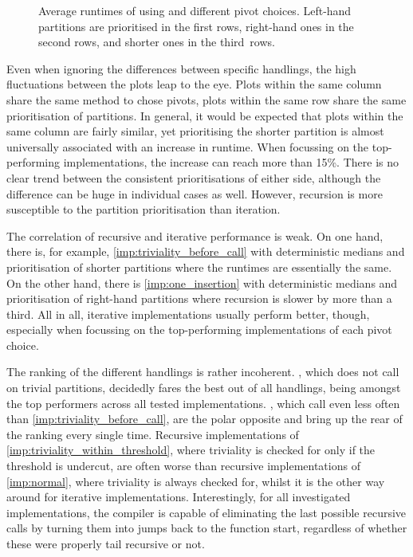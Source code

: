 \begin{figure}[p]
	\tikzexternaldisable
	\hfil{}\hfil
	\tikzexternalenable
	\caption{
		Average runtimes of \QS*{} using  and different pivot choices.
		Left-hand partitions are prio\-ri\-tised in the first rows, right-hand ones in the second rows, and shorter ones in the third~rows.
	}
	\label{fig:quick:implementations}
\end{figure}

Even when ignoring the differences between specific handlings, the high fluctuations between the plots leap to the eye.
Plots within the same column share the same method to chose pivots, plots within the same row share the same prioritisation of partitions.
In general, it would be expected that plots within the same column are fairly similar, yet prioritising the shorter partition is almost universally associated with an increase in runtime.
When focussing on the top-performing implementations, the increase can reach more than 15\%.
There is no clear trend between the consistent prioritisations of either side, although the difference can be huge in individual cases as well.
However, recursion is more susceptible to the partition prioritisation than iteration.

The correlation of recursive and iterative performance is weak.
On one hand, there is, for example, \cref{imp:triviality_before_call} with deterministic medians and prioritisation of shorter partitions where the runtimes are essentially the same.
On the other hand, there is \cref{imp:one_insertion} with deterministic medians and prioritisation of right-hand partitions where recursion is slower by more than a third.
All in all, iterative implementations usually perform better, though, especially when focussing on the top-performing implementations of each pivot choice.

The ranking of the different handlings is rather incoherent.
, which does not call \QS{} on trivial partitions, decidedly fares the best out of all handlings, being amongst the top performers across all tested implementations.
, which call \QS{} even less often than \cref{imp:triviality_before_call}, are the polar opposite and bring up the rear of the ranking every single time.
Recursive implementations of \cref{imp:triviality_within_threshold}, where triviality is checked for only if the threshold is undercut, are often worse than recursive implementations of \cref{imp:normal}, where triviality is always checked for, whilst it is the other way around for iterative implementations.
Interestingly, for all investigated implementations, the compiler is capable of eliminating the last possible recursive calls by turning them into jumps back to the function start, regardless of whether these were properly tail recursive or not.

